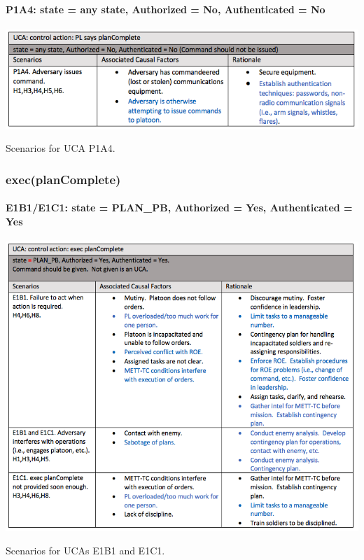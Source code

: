 \documentclass[../../main/main.tex]{subfiles}
\begin{document}
\clearpage


\paragraph*{P1A4: state  = any state, Authorized = No, Authenticated = No}

\begin{table}[ht!]
\begin{center}
\includegraphics[width=\linewidth]{../figures/ucap1a4}
\caption{Scenarios for UCA P1A4.}
\label{ucap1a4}
\end{center}
\end{table}
\clearpage


\subsubsection*{exec(planComplete)}
\paragraph*{E1B1/E1C1: state = PLAN_PB, Authorized = Yes, Authenticated = Yes}

\begin{table}[ht!]
\begin{center}
\includegraphics[width=\linewidth]{../figures/ucae1b1e1c1}
\caption{Scenarios for UCAs E1B1 and E1C1.}
\label{ucae1b1e1c1}
\end{center}
\end{table}
\clearpage
\end{document}
